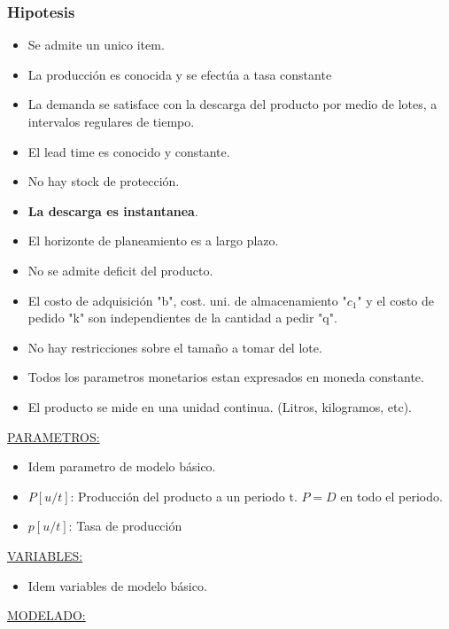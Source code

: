 \documentclass{article}
\begin{document}
\subsubsection{Hipotesis}
\begin{itemize}
    \item Se admite un unico item.
    \item La producción es conocida y se efectúa a tasa constante
    \item La demanda se satisface con la descarga del producto por medio de lotes, a intervalos regulares de tiempo.
    \item El lead time es conocido y constante.
    \item No hay stock de protección.
    \item \textbf{La descarga es instantanea}.
    \item El horizonte de planeamiento es a largo plazo.
    \item No se admite deficit del producto.
    \item El costo de adquisición "b", cost. uni. de almacenamiento "\(c_1\)" y el costo de pedido "k" son independientes de la cantidad a pedir "q".
    \item No hay restricciones sobre el tamaño a tomar del lote.
    \item Todos los parametros monetarios estan expresados en moneda constante.
    \item El producto se mide en una unidad continua. (Litros, kilogramos, etc).
\end{itemize}

\noindent
\underline{PARAMETROS:}
\begin{itemize}
    \item Idem parametro de modelo básico.
    \item \(P[u/t]\): Producción del producto a un periodo t. \(P=D\) en todo el periodo.
    \item \(p[u/t]\): Tasa de producción
\end{itemize}

\noindent
\underline{VARIABLES:}
\begin{itemize}
    \item Idem variables de modelo básico.
\end{itemize}


\noindent
\underline{MODELADO:}
\end{document}
